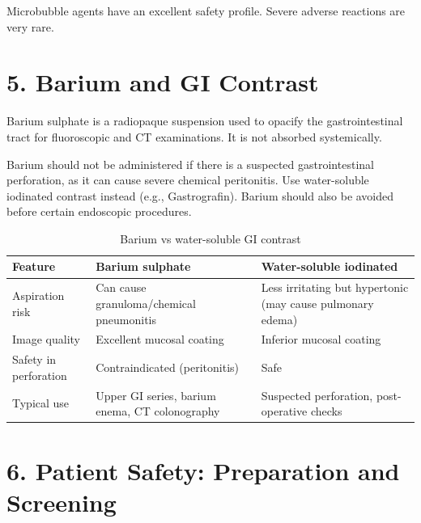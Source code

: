 Microbubble agents have an excellent safety profile. Severe adverse reactions are very rare.


\section*{5. Barium and GI Contrast}
Barium sulphate is a radiopaque suspension used to opacify the gastrointestinal tract for fluoroscopic and CT examinations. It is not absorbed systemically.

\begin{warnbox}
Barium should not be administered if there is a suspected gastrointestinal perforation, as it can cause severe chemical peritonitis. Use water-soluble iodinated contrast instead (e.g., Gastrografin). Barium should also be avoided before certain endoscopic procedures.
\end{warnbox}

\begin{table}[h]
\centering
\caption{Barium vs water-soluble GI contrast}
\begin{tabular}{|p{}|p{}|p{}|}
\hline
\textbf{Feature} & \textbf{Barium sulphate} & \textbf{Water-soluble iodinated} \\
\hline
Aspiration risk & Can cause granuloma/chemical pneumonitis & Less irritating but hypertonic (may cause pulmonary edema) \\
\hline
Image quality & Excellent mucosal coating & Inferior mucosal coating \\
\hline
Safety in perforation & Contraindicated (peritonitis) & Safe \\
\hline
Typical use & Upper GI series, barium enema, CT colonography & Suspected perforation, post-operative checks \\
\hline
\end{tabular}
\end{table}


\section*{6. Patient Safety: Preparation and Screening}

